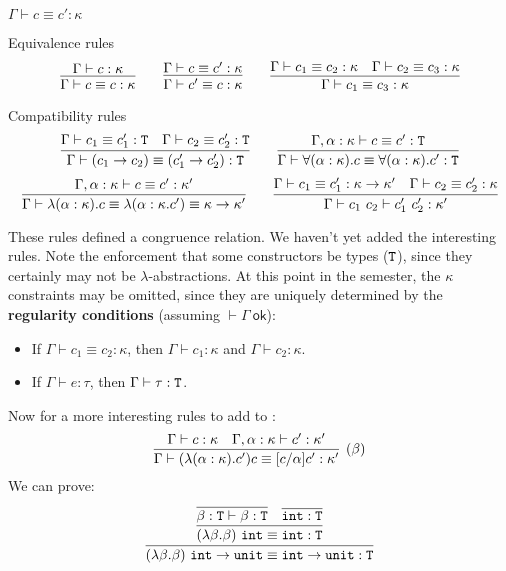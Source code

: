 \begin{judgment}[Equivalence]
$\Gamma \vdash c \equiv c' : \kappa$

Equivalence rules
\[
  \infer{\Gamma \vdash c \equiv c : \kappa}{\Gamma \vdash c : \kappa}
  \qquad
  \infer{\Gamma \vdash c' \equiv c : \kappa}{\Gamma \vdash c \equiv c' : \kappa}
  \qquad
  \infer{\Gamma \vdash c_1 \equiv c_3 : \kappa}
        {\Gamma \vdash c_1 \equiv c_2 : \kappa
        &\Gamma \vdash c_2 \equiv c_3 : \kappa
        }
\]

Compatibility rules
\[
  \infer{\Gamma \vdash (c_1 \rightarrow c_2) \equiv (c_1' \rightarrow c_2') : \T}
        {\Gamma \vdash c_1 \equiv c_1' : \T
        &\Gamma \vdash c_2 \equiv c_2' : \T
        }
  \qquad
  \infer{\Gamma \vdash \forall(\alpha : \kappa).c \equiv \forall(\alpha : \kappa).c' : \T}
        {\Gamma, \alpha : \kappa \vdash c \equiv c' : \T}
\]
\[
  \infer{\Gamma \vdash \lambda(\alpha : \kappa).c \equiv
          \lambda (\alpha : \kappa.c') \equiv \kappa \rightarrow \kappa'}
       {\Gamma, \alpha : \kappa \vdash c \equiv c' : \kappa'}
  \qquad
  \infer{\Gamma \vdash c_1 ~ c_2 \vdash c_1'~c_2' : \kappa'}
        {\Gamma \vdash c_1 \equiv c_1' : \kappa \rightarrow \kappa'
        &\Gamma \vdash c_2 \equiv c_2' : \kappa
        }
\]
\end{judgment}
These rules defined a congruence relation. We haven't yet added the interesting rules.
Note the enforcement that some constructors be types ($\textnormal{\texttt{T}}$), since they certainly
may not be $\lambda$-abstractions. At this point in the semester, the $\kappa$ constraints
may be omitted, since they are uniquely determined by the \textbf{regularity conditions}
(assuming $\vdash \Gamma~\mathsf{ok}$):
\begin{itemize}
  \item If $\Gamma \vdash c_1 \equiv c_2 : \kappa$, then $\Gamma \vdash c_1 : \kappa$
    and $\Gamma \vdash c_2 : \kappa$.
  \item If $\Gamma \vdash e : \tau$, then $\Gamma \vdash \tau : \textnormal{\texttt{T}}$.
\end{itemize}

Now for a more interesting rules to add to :
\[
  \infer[(\beta)]
    {\Gamma \vdash (\lambda (\alpha : \kappa). c') c \equiv [c / \alpha]c' : \kappa'}
    {\Gamma \vdash c : \kappa
    & \Gamma, \alpha : \kappa \vdash c' : \kappa'
    }
\]
We can prove:
\[
  \infer
    {(\lambda \beta. \beta)~\int \rightarrow \unit \equiv \int \rightarrow \unit : \T}
    {\infer
       {(\lambda \beta. \beta)~\int \equiv \int : \T}
       {\infer{\beta : \T \vdash \beta : \T}{}
       &\infer{\int : \T}{}
       }
    }
\]


